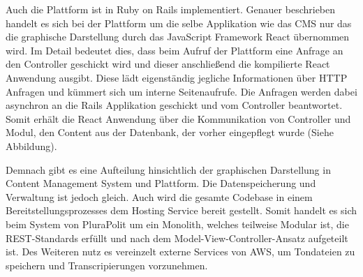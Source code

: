 
Auch die Plattform ist in Ruby on Rails implementiert. Genauer beschrieben handelt es sich bei der Plattform um die selbe Applikation wie das CMS nur das die graphische Darstellung durch das JavaScript Framework React übernommen wird. Im Detail bedeutet dies, dass beim Aufruf der Plattform eine Anfrage an den Controller geschickt wird und dieser anschließend die kompilierte React Anwendung ausgibt. Diese lädt eigenständig jegliche Informationen über HTTP Anfragen und kümmert sich um interne Seitenaufrufe. Die Anfragen werden dabei asynchron an die Rails Applikation geschickt und vom Controller beantwortet. Somit erhält die React Anwendung über die Kommunikation von Controller und Modul, den Content aus der Datenbank, der vorher eingepflegt wurde (Siehe Abbildung).

Demnach gibt es eine Aufteilung hinsichtlich der graphischen Darstellung in Content Management System und Plattform. Die Datenspeicherung und Verwaltung ist jedoch gleich. Auch wird die gesamte Codebase in einem Bereitstellungsprozesses dem Hosting Service bereit gestellt. Somit handelt es sich beim System von PluraPolit um ein Monolith, welches teilweise Modular ist, die REST-Standards erfüllt und nach dem Model-View-Controller-Ansatz aufgeteilt ist. Des Weiteren nutz es vereinzelt externe Services von AWS, um Tondateien zu speichern und Transcripierungen vorzunehmen.

